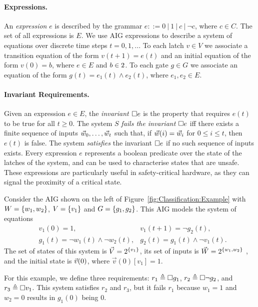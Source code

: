 \paragraph{Expressions.}
An \emph{expression} $e$ is described by the grammar $e::= 0\ |\ 1\ |\ c\ |\ \lnot c$, where $c \in C$. The set of all expressions is $E$. We use AIG expressions to describe a system of equations over discrete time steps $t=0,1,..$. To each latch $v\in V$ we associate a transition {equation} of the form $v(t+1) = e(t)$ and an initial equation of the form $v(0)=b$, where $e\in E$ and $b\in 2$. To each gate $g\in G$ we associate an equation of the form $g(t)=e_1(t)\land e_2(t)$, where $e_1,e_2\in E$. 

\paragraph{Invariant Requirements.}
Given an expression $e\in E$, the \emph{invariant ${{\square}} e$} is the property that requires $e(t)$ to be true for all $t\geq 0$. The system $S$ \emph{fails the invariant ${{\square}} e$} iff there exists a finite sequence of inputs ${\vec{w}_0, \ldots, \vec{w}_t}$ such that, if $\vec{w}(i)=\vec{w}_i$ for $0\leq i \leq t$, then $e(t)$ is false. The system \emph{satisfies} the invariant ${{\square}} e$ if no such sequence of inputs exists. Every expression $e$ represents a boolean predicate over the state of the latches of the system, and can be used to characterise states that are unsafe. These expressions are particularly useful in safety-critical hardware, as they can signal the proximity of a critical state.


\begin{example}
Consider the AIG shown on the left of Figure~\ref{fig:Classification:Example} with $W=\left\{w_1,w_2\right\}$, $V=\left\{v_1\right\}$ and $G=\left\{g_1,g_2\right\}$. This AIG models the system of equations
\begin{align*}
&v_1(0)=1, & v_1(t+1)=\lnot g_2(t),\\
&g_1(t)=\lnot w_1(t) \land \lnot w_2(t), & g_2(t)=g_1(t) \land \lnot v_1(t).
\end{align*}
The set of states of this system is $\vec{V}=2^{\left\{v_1\right\}}$, its set of inputs is $\vec{W}=2^{\left\{w_1,w_2\right\}}$
, and the initial state is $\vec{v}(0)$, where $\vec{v}(0)[v_1]=1$.

For this example, we define three requirements: $r_1\triangleq{{\square}} g_1$, $r_2 \triangleq{{\square}} \lnot g_2$, and $r_3\triangleq{{\square}} v_1$. This system satisfies $r_2$ and $r_3$, but it fails $r_1$ because $w_1=1$ and $w_2=0$ results in $g_1(0)$ being 0.
\end{example}

